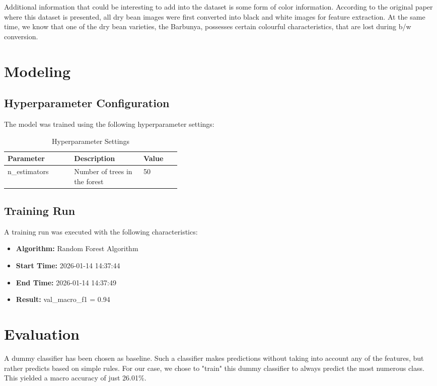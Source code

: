 \documentclass[sigconf]{acmart}
\begin{document}
Additional information that could be interesting to add into the dataset is some form of color information. According to the original paper where this dataset is presented, all dry bean images were first converted into black and white images for feature extraction. At the same time, we know that one of the dry bean varieties, the Barbunya, possesses certain colourful characteristics, that are lost during b/w conversion.


\section{Modeling}

\subsection{Hyperparameter Configuration}
The model was trained using the following hyperparameter settings:

\begin{table}[h]
  \caption{Hyperparameter Settings}
  \label{tab:hyperparams}
  \begin{tabular}{lp{0.4\linewidth}l}
    \toprule
    \textbf{Parameter} & \textbf{Description} & \textbf{Value} \\
    \midrule
    n\_estimators & Number of trees in the forest & 50 \\
    \bottomrule
  \end{tabular}
\end{table}

\subsection{Training Run}
A training run was executed with the following characteristics:
\begin{itemize}
    \item \textbf{Algorithm:} Random Forest Algorithm
    \item \textbf{Start Time:} 2026-01-14 14:37:44
    \item \textbf{End Time:} 2026-01-14 14:37:49
    \item \textbf{Result:} val\_macro\_f1 = 0.94
\end{itemize}

\section{Evaluation}
A dummy classifier has been chosen as baseline. Such a classifier makes predictions without taking into account any of the features, but rather predicts based on simple rules. For our case, we chose to "train" this dummy classifier to always predict the most numerous class. This yielded a macro accuracy of just 26.01\%.
\end{document}
